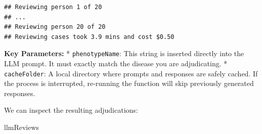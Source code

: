 \documentclass[
]{article}
\newenvironment{Shaded}{\begin{snugshade}}{\end{snugshade}}
\newcommand{\NormalTok}[1]{#1}
\begin{document}
\begin{verbatim}
## Reviewing person 1 of 20
## ...
## Reviewing person 20 of 20
## Reviewing cases took 3.9 mins and cost $0.50
\end{verbatim}

\textbf{Key Parameters:} * \texttt{phenotypeName}: This string is
inserted directly into the LLM prompt. It must exactly match the disease
you are adjudicating. * \texttt{cacheFolder}: A local directory where
prompts and responses are safely cached. If the process is interrupted,
re-running the function will skip previously generated responses.

We can inspect the resulting adjudications:

\begin{Shaded}
\begin{Highlighting}[]
\NormalTok{llmReviews}
\end{Highlighting}
\end{Shaded}
\end{document}
